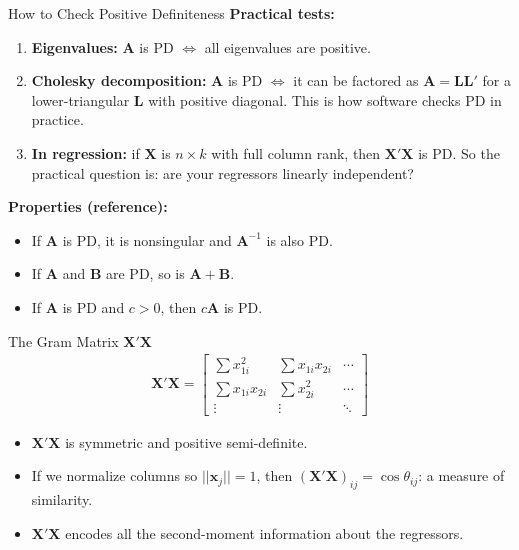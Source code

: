 \documentclass[aspectratio=169, handout, t]{beamer}
\numberwithin{equation}{section}
\begin{document}
\begin{frame}{How to Check Positive Definiteness}
\textbf{Practical tests:}
\begin{enumerate}
\item \textbf{Eigenvalues:} $\bm{A}$ is PD $\iff$ all eigenvalues are positive.
\item \textbf{Cholesky decomposition:} $\bm{A}$ is PD $\iff$ it can be factored as $\bm{A}=\bm{L}\bm{L}'$ for a lower-triangular $\bm{L}$ with positive diagonal. This is how software checks PD in practice.
\item \textbf{In regression:} if $\bm{X}$ is $n\times k$ with full column rank, then $\bm{X}'\bm{X}$ is PD. So the practical question is: are your regressors linearly independent?
\end{enumerate}\pause
\textbf{Properties (reference):}
\begin{itemize}
\item If $\bm{A}$ is PD, it is nonsingular and $\bm{A}^{-1}$ is also PD.
\item If $\bm{A}$ and $\bm{B}$ are PD, so is $\bm{A}+\bm{B}$.
\item If $\bm{A}$ is PD and $c>0$, then $c\bm{A}$ is PD.
\end{itemize}
\end{frame}

\begin{frame}{The Gram Matrix $\bm{X}'\bm{X}$}
\begin{align*}
\bm{X}'\bm{X}  = \begin{bmatrix} \sum x_{1i}^2 & \sum x_{1i}x_{2i}& \cdots\\
\sum x_{1i}x_{2i}& \sum x_{2i}^2  & \cdots\\
\vdots & \vdots & \ddots
  \end{bmatrix}
  \end{align*}
\begin{itemize}
  \item $\bm{X}'\bm{X}$ is symmetric and positive semi-definite.\pause
  \item If we normalize columns so $||\bm{x}_j||=1$, then $(\bm{X}'\bm{X})_{ij}=\cos\theta_{ij}$: a measure of similarity.\pause
  \item $\bm{X}'\bm{X}$ encodes all the second-moment information about the regressors.
\end{itemize}
\end{frame}

\end{document}

